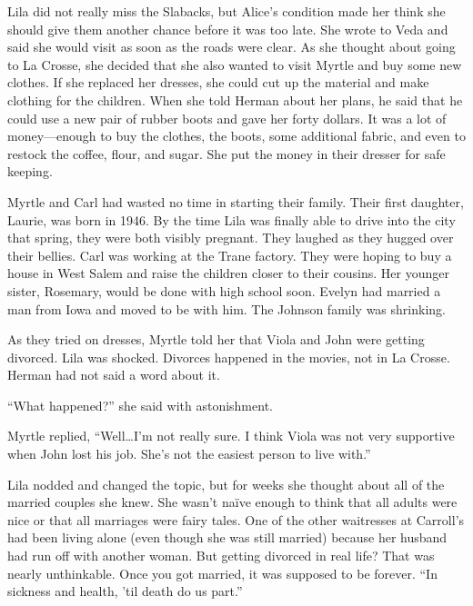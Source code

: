 \documentclass[
  letterpaper,
]{book}
\begin{document}
Lila did not really miss the Slabacks, but Alice's condition made her
think she should give them another chance before it was too late. She
wrote to Veda and said she would visit as soon as the roads were clear.
As she thought about going to La Crosse, she decided that she also
wanted to visit Myrtle and buy some new clothes. If she replaced her
dresses, she could cut up the material and make clothing for the
children. When she told Herman about her plans, he said that he could
use a new pair of rubber boots and gave her forty dollars. It was a lot
of money---enough to buy the clothes, the boots, some additional fabric,
and even to restock the coffee, flour, and sugar. She put the money in
their dresser for safe keeping.

Myrtle and Carl had wasted no time in starting their family. Their first
daughter, Laurie, was born in 1946. By the time Lila was finally able to
drive into the city that spring, they were both visibly pregnant. They
laughed as they hugged over their bellies. Carl was working at the Trane
factory. They were hoping to buy a house in West Salem and raise the
children closer to their cousins. Her younger sister, Rosemary, would be
done with high school soon. Evelyn had married a man from Iowa and moved
to be with him. The Johnson family was shrinking.

As they tried on dresses, Myrtle told her that Viola and John were
getting divorced. Lila was shocked. Divorces happened in the movies, not
in La Crosse. Herman had not said a word about it.

``What happened?'' she said with astonishment.

Myrtle replied, ``Well\ldots I'm not really sure. I think Viola was not
very supportive when John lost his job. She's not the easiest person to
live with.''

Lila nodded and changed the topic, but for weeks she thought about all
of the married couples she knew. She wasn't naïve enough to think that
all adults were nice or that all marriages were fairy tales. One of the
other waitresses at Carroll's had been living alone (even though she was
still married) because her husband had run off with another woman. But
getting divorced in real life? That was nearly unthinkable. Once you got
married, it was supposed to be forever. ``In sickness and health, 'til
death do us part.''
\end{document}
